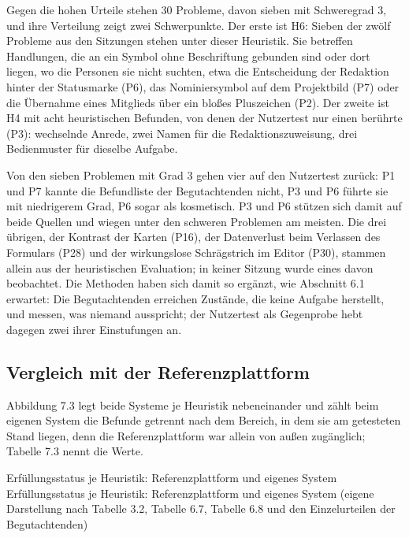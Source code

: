Gegen die hohen Urteile stehen 30 Probleme, davon sieben mit Schweregrad 3, und ihre Verteilung zeigt zwei Schwerpunkte. Der erste ist H6: Sieben der zwölf Probleme aus den Sitzungen stehen unter dieser Heuristik. Sie betreffen Handlungen, die an ein Symbol ohne Beschriftung gebunden sind oder dort liegen, wo die Personen sie nicht suchten, etwa die Entscheidung der Redaktion hinter der Statusmarke (P6), das Nominiersymbol auf dem Projektbild (P7) oder die Übernahme eines Mitglieds über ein bloßes Pluszeichen (P2). Der zweite ist H4 mit acht heuristischen Befunden, von denen der Nutzertest nur einen berührte (P3): wechselnde Anrede, zwei Namen für die Redaktionszuweisung, drei Bedienmuster für dieselbe Aufgabe.

Von den sieben Problemen mit Grad 3 gehen vier auf den Nutzertest zurück: P1 und P7 kannte die Befundliste der Begutachtenden nicht, P3 und P6 führte sie mit niedrigerem Grad, P6 sogar als kosmetisch. P3 und P6 stützen sich damit auf beide Quellen und wiegen unter den schweren Problemen am meisten. Die drei übrigen, der Kontrast der Karten (P16), der Datenverlust beim Verlassen des Formulars (P28) und der wirkungslose Schrägstrich im Editor (P30), stammen allein aus der heuristischen Evaluation; in keiner Sitzung wurde eines davon beobachtet. Die Methoden haben sich damit so ergänzt, wie Abschnitt 6.1 erwartet: Die Begutachtenden erreichen Zustände, die keine Aufgabe herstellt, und messen, was niemand ausspricht; der Nutzertest als Gegenprobe hebt dagegen zwei ihrer Einstufungen an.

\subsection{Vergleich mit der Referenzplattform}

Abbildung 7.3 legt beide Systeme je Heuristik nebeneinander und zählt beim eigenen System die Befunde getrennt nach dem Bereich, in dem sie am getesteten Stand liegen, denn die Referenzplattform war allein von außen zugänglich; Tabelle 7.3 nennt die Werte.

%
{Erfüllungsstatus je Heuristik: Referenzplattform und eigenes System}%
{Erfüllungsstatus je Heuristik: Referenzplattform und eigenes System (eigene Darstellung nach Tabelle 3.2, Tabelle 6.7, Tabelle 6.8 und den Einzelurteilen der Begutachtenden)}

